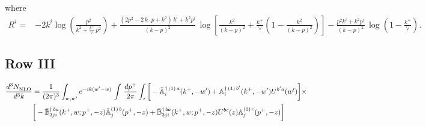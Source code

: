 \documentclass[9pt]{article}
\def\mf#1{\mathbb{#1}}
\numberwithin{equation}{section}
\begin{document}
where
\begin{align}
R^{i} =& -2k^{i}\log\left(\frac{p^{2}}{k^{2}+\frac{k^{+}}{\vee}\,p^{2}}\right)
+\frac{(2p^{2}-2\,k\cdot p+k^{2})\,k^{i}+k^{2}p^{i}}{(k-p)^{2}}\,
\log\left[\frac{k^{2}}{(k-p)^{2}}+\frac{k^{+}}{\vee}\left(1-\frac{k^{2}}{(k-p)^{2}}\right)\right]
-\frac{p^{2}k^{i}+k^{2}p^{i}}{(k-p)^{2}}\,\log\left(1-\frac{k^{+}}{\vee}\right).
\end{align}
\subsection{Row III\,}
\begin{align}
\frac{d^{3}N_{\rm NLO}^{\rm}}{d^{3}k}  & = \frac{1}{(2\pi)^{3}}  \int_{w, w^\prime} e^{-ik(w^\prime-w)}\, \int\,\frac{dp^{+}}{2\pi} \int_{z} \bigg[-\bar{\mf{A}}^{\dagger\,(1)\,a}_{i}(k^{+},-w^{\prime})+\mf{A}^{\dagger\, (1)\, b^{\prime}}_{i}(k^{+},-w^{\prime})U^{b^{\prime}a}(w^{\prime})\bigg]\times \notag \\ &  \bigg[-\Bar{\mf{B}}^{\dagger\, ba}_{3ji}(k^{+}, w; p^{+}, -z)\Bar{\mf{A}}^{(1)\,b}_{j}(p^{+}, - z)+ \Bar{\mf{B}}^{\dagger\, ba}_{3ji}(k^{+},w; p^{+},-z) U^{bc}(z) \mf{A}^{(1)\, c}_{j}(p^{+},- z)\bigg]\nonumber
\end{align}
\end{document}
